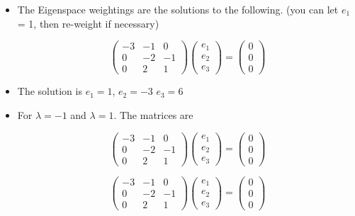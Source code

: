 \documentclass[12pt, a4paper]{report}
\theoremstyle{plain}
\theoremstyle{definition}
\theoremstyle{remark}
\begin{document}
{\newpage
{\Large
\begin{itemize}
\item The Eigenspace weightings are the solutions to the following. (you can let $e_1$ = 1, then re-weight if necessary)

\[\left(\begin{array}{ccc}
-3 & -1 & 0 \\
0 & -2 & -1 \\
0 & 2 & 1
\end{array} \right)
\left(\begin{array}{c}
e_1 \\
e_2 \\
e_3
\end{array} \right) = \left(\begin{array}{c}
0 \\
0 \\
0
\end{array} \right)\]
\item The solution is $e_1=1$, $e_2=-3$ $e_3=6$

\item For $\lambda =-1$ and $\lambda =1$. The matrices are

\[\left(\begin{array}{ccc}
-3 & -1 & 0 \\
0 & -2 & -1 \\
0 & 2 & 1
\end{array} \right) \left(\begin{array}{c}
e_1 \\
e_2 \\
e_3
\end{array} \right) = \left(\begin{array}{c}
0 \\
0 \\
0
\end{array} \right)\]

\[
\left(\begin{array}{ccc}
-3 & -1 & 0 \\
0 & -2 & -1 \\
0 & 2 & 1
\end{array} \right)\left(\begin{array}{c}
e_1 \\
e_2 \\
e_3
\end{array} \right) = \left(\begin{array}{c}
0 \\
0 \\
0
\end{array} \right)\]


\end{itemize}}}
\end{document}

